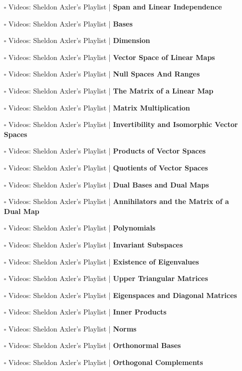 \documentclass[a4, landscape, 12pt]{article}
\newcommand{\checkbox}{$\square$}%
\begin{document}
\begin{itemize}
{}
\item [\checkbox] Videos: Sheldon Axler’s Playlist  | \textbf{Span and Linear Independence
}
\item [\checkbox] Videos: Sheldon Axler’s Playlist  | \textbf{Bases
}
\item [\checkbox] Videos: Sheldon Axler’s Playlist  | \textbf{Dimension
}
\item [\checkbox] Videos: Sheldon Axler’s Playlist  | \textbf{Vector Space of Linear Maps
}
\item [\checkbox] Videos: Sheldon Axler’s Playlist  | \textbf{Null Spaces And Ranges
}
\item [\checkbox] Videos: Sheldon Axler’s Playlist  | \textbf{The Matrix of a Linear Map
}
\item [\checkbox] Videos: Sheldon Axler’s Playlist  | \textbf{Matrix Multiplication
}
\item [\checkbox] Videos: Sheldon Axler’s Playlist  | \textbf{Invertibility and Isomorphic Vector Spaces
}
\item [\checkbox] Videos: Sheldon Axler’s Playlist  | \textbf{Products of Vector Spaces
}
\item [\checkbox] Videos: Sheldon Axler’s Playlist  | \textbf{Quotients of Vector Spaces
}
\item [\checkbox] Videos: Sheldon Axler’s Playlist  | \textbf{Dual Bases and Dual Maps
}
\item [\checkbox] Videos: Sheldon Axler’s Playlist  | \textbf{Annihilators and the Matrix of a Dual Map
}
\item [\checkbox] Videos: Sheldon Axler’s Playlist  | \textbf{Polynomials
}
\item [\checkbox] Videos: Sheldon Axler’s Playlist  | \textbf{Invariant Subspaces
}
\item [\checkbox] Videos: Sheldon Axler’s Playlist  | \textbf{Existence of Eigenvalues
}
\item [\checkbox] Videos: Sheldon Axler’s Playlist  | \textbf{Upper Triangular Matrices
}
\item [\checkbox] Videos: Sheldon Axler’s Playlist  | \textbf{Eigenspaces and Diagonal Matrices
}
\item [\checkbox] Videos: Sheldon Axler’s Playlist  | \textbf{Inner Products
}
\item [\checkbox] Videos: Sheldon Axler’s Playlist  | \textbf{Norms
}
\item [\checkbox] Videos: Sheldon Axler’s Playlist  | \textbf{Orthonormal Bases
}
\item [\checkbox] Videos: Sheldon Axler’s Playlist  | \textbf{Orthogonal Complements
}
\end{itemize}
\end{document}
